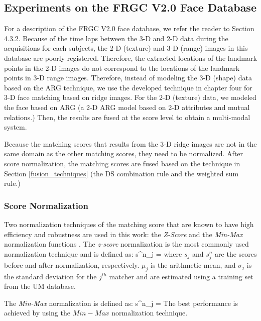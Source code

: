 {\subsection{Experiments on the FRGC V2.0 Face Database}
For a description of the FRGC V2.0 face database, we refer the
reader to Section 4.3.2. Because of the time laps between the 3-D
and 2-D data during the acquisitions for each subjects, the 2-D
(texture) and 3-D (range) images in this database are poorly
registered. Therefore, the extracted locations of the landmark
points in the 2-D images do not correspond to the locations of the
landmark points in 3-D range images. Therefore, instead of modeling
the 3-D (shape) data based on the ARG technique, we use the
developed technique in chapter four for 3-D face matching based on
ridge images. For the 2-D (texture) data, we modeled the face based
on ARG (a 2-D ARG model based on 2-D attributes and mutual
relations.) Then, the results are fused at the score level to obtain
a multi-modal system.

Because the matching scores that results from the 3-D ridge images
are not in the same domain as the other matching scores, they need
to be normalized. After score normalization, the matching scores are
fused based on the technique in Section \ref{fusion_techniques} (the
DS combination rule and the weighted sum rule.)

\subsubsection{Score Normalization}
Two normalization techniques of the matching score that are known to
have high efficiency and robustness are used in this work: the
\textit{Z-Score} and the \textit{Min-Max} normalization functions
\cite{Ross06}. The \textit{z-score} normalization is the most
commonly used normalization technique and is defined as: \beq
\label{eq_z_score} s^n_j = \eeq where
$s_j$ and $s^n_j$ are the scores before and after normalization,
respectively. $\mu_j$ is the arithmetic mean, and $\sigma_j$ is the
standard deviation for the $j^{th}$ matcher and are estimated using
a training set from the UM database.

The \textit{Min-Max} normalization is defined as: \beq
\large{\label{eq_min_max} s^n_j = }\eeq The best performance is achieved by using the
$Min-Max$ normalization technique.

}

